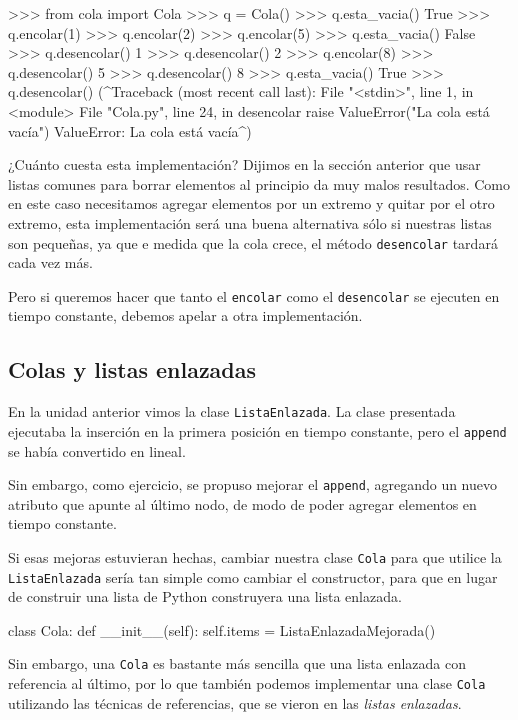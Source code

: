 \begin{codigo-python-sn}
>>> from cola import Cola
>>> q = Cola()
>>> q.esta_vacia()
True
>>> q.encolar(1)
>>> q.encolar(2)
>>> q.encolar(5)
>>> q.esta_vacia()
False
>>> q.desencolar()
1
>>> q.desencolar()
2
>>> q.encolar(8)
>>> q.desencolar()
5
>>> q.desencolar()
8
>>> q.esta_vacia()
True
>>> q.desencolar()
(^Traceback (most recent call last):
  File "<stdin>", line 1, in <module>
  File "Cola.py", line 24, in desencolar
    raise ValueError("La cola está vacía")
ValueError: La cola está vacía^)
\end{codigo-python-sn}

¿Cuánto cuesta esta implementación?  Dijimos en la sección anterior que
usar listas comunes para borrar elementos al principio da muy malos
resultados. Como en este caso necesitamos agregar elementos por un extremo
y quitar por el otro extremo, esta implementación será una buena
alternativa sólo si nuestras listas son pequeñas, ya que e medida que la
cola crece, el método \lstinline!desencolar! tardará cada vez más.

Pero si queremos hacer que tanto el \lstinline!encolar! como el
\lstinline!desencolar!  se ejecuten en tiempo constante, debemos apelar a
otra implementación.

\subsection{Colas y listas enlazadas}

En la unidad anterior vimos la clase \lstinline!ListaEnlazada!.
La clase presentada ejecutaba la inserción en la primera posición en
tiempo constante, pero el \lstinline|append| se había convertido en lineal.

Sin embargo, como ejercicio, se propuso mejorar el \lstinline|append|,
agregando un nuevo atributo que apunte al último nodo, de modo de poder
agregar elementos en tiempo constante.

Si esas mejoras estuvieran hechas, cambiar nuestra clase \lstinline!Cola!
para que utilice la \lstinline!ListaEnlazada! sería tan simple como cambiar
el constructor, para que en lugar de construir una lista de Python
construyera una lista enlazada.

\begin{codigo-python-sn}
class Cola:
    def __init__(self):
        self.items = ListaEnlazadaMejorada()
\end{codigo-python-sn}

Sin embargo, una \lstinline!Cola! es bastante más sencilla que una
lista enlazada con referencia al último, por lo que también podemos
implementar una clase \lstinline!Cola! utilizando las técnicas de referencias,
que se vieron en las \emph{listas enlazadas}.

